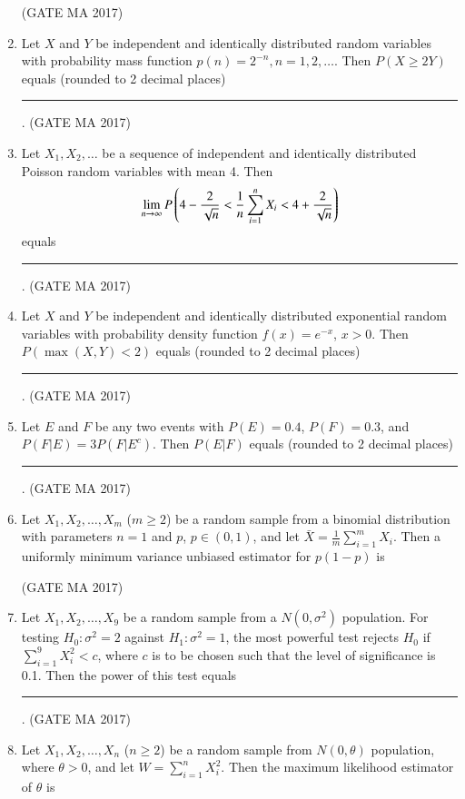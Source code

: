 \documentclass[journal,12pt,onecolumn]{IEEEtran}
\theoremstyle{remark}
\begin{document}
\begin{enumerate}
\hfill (GATE MA 2017)
\item
Let $X$ and $Y$ be independent and identically distributed random variables with probability mass function $p(n) = 2^{-n}, n = 1, 2, \ldots$. Then $P(X \geq 2Y)$ equals (rounded to 2 decimal places) \rule{1.5cm}{0.4pt}.
\hfill (GATE MA 2017)
\item
Let $X_1, X_2, \ldots$ be a sequence of independent and identically distributed Poisson random variables with mean 4. Then
$$
\lim_{n \rightarrow \infty} P\left(4-\frac{2}{\sqrt{n}} < \frac{1}{n} \sum_{i=1}^{n} X_i < 4+\frac{2}{\sqrt{n}}\right)
$$
equals \rule{1.5cm}{0.4pt}.
\hfill (GATE MA 2017)
\item
Let $X$ and $Y$ be independent and identically distributed exponential random variables with probability density function $f(x) = e^{-x}$, $x > 0$. Then $P(\max(X, Y) < 2)$ equals (rounded to 2 decimal places) \rule{1.5cm}{0.4pt}.
\hfill (GATE MA 2017)
\item
Let $E$ and $F$ be any two events with $P(E) = 0.4$, $P(F) = 0.3$, and $P(F | E) = 3P(F | E^c)$. Then $P(E | F)$ equals (rounded to 2 decimal places) \rule{1.5cm}{0.4pt}.
\hfill (GATE MA 2017)
\item
Let $X_1, X_2, \ldots, X_m$ ($m \ge 2$) be a random sample from a binomial distribution with parameters $n = 1$ and $p$, $p \in (0, 1)$, and let $\bar{X} = \frac{1}{m} \sum_{i=1}^{m} X_i$. Then a uniformly minimum variance unbiased estimator for $p(1-p)$ is
\begin{enumerate}
\end{enumerate}
\hfill (GATE MA 2017)
\item
Let $X_1, X_2, \ldots, X_9$ be a random sample from a $N(0, \sigma^2)$ population. For testing $H_0: \sigma^2 = 2$ against $H_1: \sigma^2 = 1$, the most powerful test rejects $H_0$ if $\sum_{i=1}^{9} X_i^2 < c$, where $c$ is to be chosen such that the level of significance is 0.1. Then the power of this test equals \rule{1.5cm}{0.4pt}.
\hfill (GATE MA 2017)
\item
Let $X_1, X_2, \ldots, X_n$ ($n \ge 2$) be a random sample from $N(0, \theta)$ population, where $\theta > 0$, and let $W = \sum_{i=1}^n X_i^2$. Then the maximum likelihood estimator of $\theta$ is

\end{enumerate}
\end{document}
